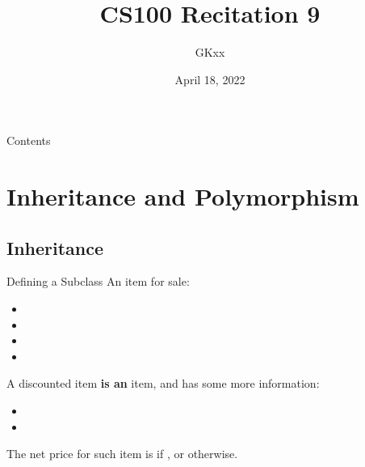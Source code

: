 \documentclass{beamer}
\title{CS100 Recitation 9}
\author{GKxx}
\date{April 18, 2022}
\begin{document}
\begin{frame}
    \maketitle
\end{frame}

\begin{frame}{Contents}
    \tableofcontents
\end{frame}

\section{Inheritance and Polymorphism}

\subsection{Inheritance}

\begin{frame}{Defining a Subclass}
    An item for sale:
    \begin{itemize}
        \item {}
        \item {}
        \item {}
        \item {}
    \end{itemize}
    A discounted item \textbf{is an} item, and has some more information:
    \begin{itemize}
        \item {}
        \item {}
    \end{itemize}
    The net price for such item is  if , or  otherwise.
\end{frame}
\end{document}
